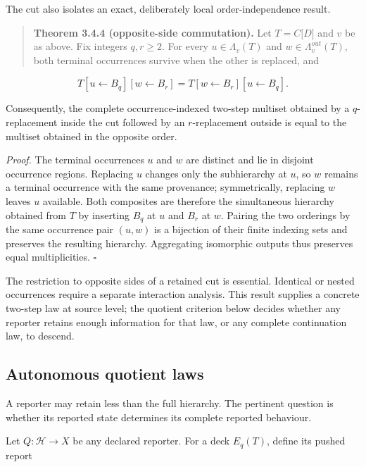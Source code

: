 \documentclass[11pt,a4paper]{article}
\begin{document}
The cut also isolates an exact, deliberately local order-independence
result.

\begin{quote}
\textbf{Theorem 3.4.4 (opposite-side commutation).} Let
\(T = C\lbrack D\rbrack\) and \(v\) be as above. Fix integers
\(q,r \geq 2\). For every \(u \in \Lambda_{v}(T)\) and
\(w \in \Lambda_{v}^{out}(T)\), both terminal occurrences survive when
the other is replaced, and
\end{quote}

\[\boxed{T\left\lbrack u \leftarrow B_{q} \right\rbrack\left\lbrack w \leftarrow B_{r} \right\rbrack = T\left\lbrack w \leftarrow B_{r} \right\rbrack\left\lbrack u \leftarrow B_{q} \right\rbrack.}\]

Consequently, the complete occurrence-indexed two-step multiset obtained
by a \(q\)-replacement inside the cut followed by an \(r\)-replacement
outside is equal to the multiset obtained in the opposite order.

\emph{Proof.} The terminal occurrences \(u\) and \(w\) are distinct and
lie in disjoint occurrence regions. Replacing \(u\) changes only the
subhierarchy at \(u\), so \(w\) remains a terminal occurrence with the
same provenance; symmetrically, replacing \(w\) leaves \(u\) available.
Both composites are therefore the simultaneous hierarchy obtained from
\(T\) by inserting \(B_{q}\) at \(u\) and \(B_{r}\) at \(w\). Pairing
the two orderings by the same occurrence pair \((u,w)\) is a bijection
of their finite indexing sets and preserves the resulting hierarchy.
Aggregating isomorphic outputs thus preserves equal multiplicities.
\(\ensuremath{\square}\)

The restriction to opposite sides of a retained cut is essential.
Identical or nested occurrences require a separate interaction analysis.
This result supplies a concrete two-step law at source level; the
quotient criterion below decides whether any reporter retains enough
information for that law, or any complete continuation law, to descend.

\subsection{Autonomous quotient
laws}

A reporter may retain less than the full hierarchy. The pertinent
question is whether its reported state determines its complete reported
behaviour.

Let \(Q:\mathcal{H} \rightarrow X\) be any declared reporter. For a deck
\(E_{q}(T)\), define its pushed report
\end{document}
